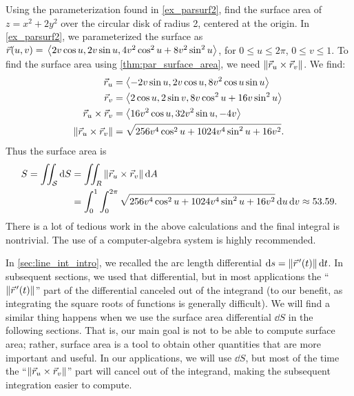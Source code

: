 \begin{example}\label{ex_parsurfarea1}%
Using the parameterization found in \autoref{ex_parsurf2}, find the surface area of $z=x^2+2y^2$ over the circular disk of radius 2, centered at the origin.
\solution
In \autoref{ex_parsurf2}, we parameterized the surface as $\vec r(u,v) =\\ \left\langle 2v\cos u, 2v\sin u, 4v^2\cos^2u+8v^2\sin^2u\right\rangle$, for $0\leq u\leq 2\pi$, $0\leq v\leq 1$. To find the surface area using \autoref{thm:par_surface_area}, we need $\left\lVert \vec r_u\times\vec r_v \right\rVert$. We find:
\begin{align*}
\vec r_u &= \left\langle -2v\sin u, 2v\cos u, 8v^2\cos u\sin u\right\rangle\\
\vec r_v &= \left\langle 2\cos u, 2\sin v, 8v\cos^2 u+16v\sin^2u\right\rangle\\
\vec r_u\times\vec r_v &= \left\langle 16v^2\cos u, 32v^2\sin u, -4v\right\rangle\\
\left\lVert \vec r_u\times\vec r_v \right\rVert &= \sqrt{256v^4\cos^2u+1024v^4\sin^2u+16v^2}.
\end{align*}
Thus the surface area is
\begin{align*}
S = \iint_{\mathcal{S}} \operatorname{d}\! S &= \iint_R\left\lVert \vec r_u\times \vec r_v \right\rVert\operatorname{d}\! A \\
& = \int_0^1\int_0^{2\pi} \sqrt{256v^4\cos^2u+1024v^4\sin^2u+16v^2}\operatorname{d}\! u\operatorname{d}\! v \approx 53.59.
\end{align*}
There is a lot of tedious work in the above calculations and the final integral is nontrivial. The use of a computer-algebra system is highly recommended.
\end{example}

In \autoref{sec:line_int_intro}, we recalled the arc length differential $\operatorname{d}\! s=\left\lVert \vec r\hskip1.25pt '(t) \right\rVert\operatorname{d}\! t$. In subsequent sections, we used that differential, but in most applications the ``$\left\lVert \vec r\hskip1.25pt '(t) \right\rVert$'' part of the differential canceled out of the integrand (to our benefit, as integrating the square roots of functions is generally difficult). We will find a similar thing happens when we use the surface area differential $\dd S$ in the following sections. That is, our main goal is not to be able to compute surface area; rather, surface area is a tool to obtain other quantities that are more important and useful. In our applications, we will use $\dd S$, but most of the time the ``$\left\lVert \vec r_u\times \vec r_v \right\rVert$'' part will cancel out of the integrand, making the subsequent integration easier to compute.

